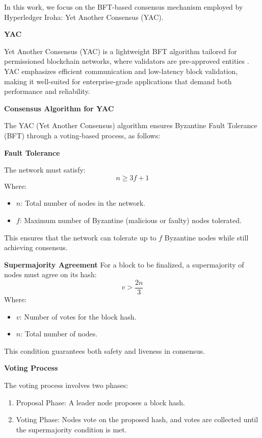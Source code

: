 \documentclass[final]{rc-book-2.14}
\begin{document}
In this work, we focus on the BFT-based consensus mechanism employed by Hyperledger Iroha: Yet Another Consensus (YAC).

\textbf{YAC}

Yet Another Consensus (YAC) is a lightweight BFT algorithm tailored for permissioned blockchain networks, where validators are pre-approved entities \cite{muratov_yac_2018}. YAC emphasizes efficient communication and low-latency block validation, making it well-suited for enterprise-grade applications that demand both performance and reliability.


\textbf{Consensus Algorithm for YAC}

The YAC (Yet Another Consensus) algorithm ensures Byzantine Fault Tolerance (BFT) through a voting-based process, as follows:

\textbf{Fault Tolerance}

The network must satisfy:
\[
    n \geq 3f + 1
\]
Where:
\begin{itemize}
    \item \( n \): Total number of nodes in the network.
    \item \( f \): Maximum number of Byzantine (malicious or faulty) nodes tolerated.
\end{itemize}

This ensures that the network can tolerate up to \( f \) Byzantine nodes while still achieving consensus.

\textbf{Supermajority Agreement}
For a block to be finalized, a supermajority of nodes must agree on its hash:
\[
    v > \frac{2n}{3}
\]
Where:
\begin{itemize}
    \item \( v \): Number of votes for the block hash.
    \item \( n \): Total number of nodes.
\end{itemize}

This condition guarantees both safety and liveness in consensus.

\textbf{Voting Process}

The voting process involves two phases:
\begin{enumerate}
    \item {Proposal Phase}: A leader node proposes a block hash.
    \item {Voting Phase}: Nodes vote on the proposed hash, and votes are collected until the supermajority condition is met.
\end{enumerate}
\end{document}
